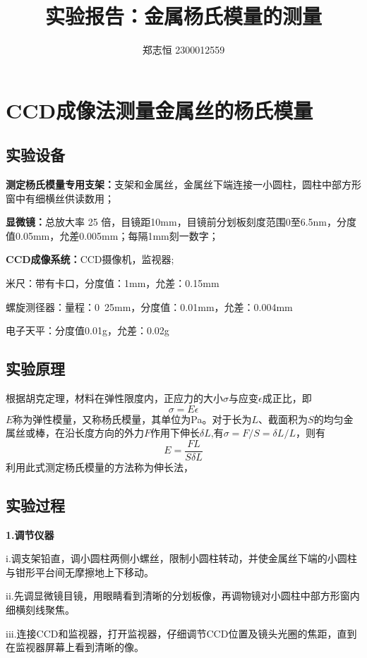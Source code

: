 \documentclass[a4paper, 10pt]{article}
\begin{document}
  \title{实验报告：金属杨氏模量的测量}
  \author{郑志恒 2300012559}
  \maketitle
  \section{CCD成像法测量金属丝的杨氏模量}
  \subsection{实验设备}
  \noindent \textbf{测定杨氏模量专用支架：}支架和金属丝，金属丝下端连接一小圆柱，圆柱中部方形窗中有细横丝供读数用；

  \vspace{10pt}
  \noindent \textbf{显微镜：}总放大率 25 倍，目镜距10mm，目镜前分划板刻度范围0至6.5nm，分度值0.05mm，允差0.005mm；每隔1mm刻一数字；
  
  \vspace{10pt}
  \noindent \textbf{CCD成像系统：}CCD摄像机，监视器;
  
  \vspace{10pt}
\noindent 米尺：带有卡口，分度值：1mm，允差：0.15mm

\noindent 螺旋测径器：量程：0~25mm，分度值：0.01mm，允差：0.004mm

\noindent 电子天平：分度值0.01g，允差：0.02g

\subsection{实验原理}
\noindent 根据胡克定理，材料在弹性限度内，正应力的大小$\sigma$与应变$\epsilon$成正比，即
$$\sigma=E\epsilon$$
$E$称为弹性模量，又称杨氏模量，其单位为Pa。对于长为$L$、截面积为$S$的均匀金属丝或棒，在沿长度方向的外力$F$作用下伸长$\delta L$,有$\sigma=F/S=\delta L/L$，则有
$$E=\frac{FL}{S\delta L}$$
利用此式测定杨氏模量的方法称为伸长法，
\subsection{实验过程}
\noindent \textbf{1.调节仪器}

\noindent i.调支架铅直，调小圆柱两侧小螺丝，限制小圆柱转动，并使金属丝下端的小圆柱与钳形平台间无摩擦地上下移动。

\noindent ii.先调显微镜目镜，用眼睛看到清晰的分划板像，再调物镜对小圆柱中部方形窗内细横刻线聚焦。

\noindent iii.连接CCD和监视器，打开监视器，仔细调节CCD位置及镜头光圈的焦距，直到在监视器屏幕上看到清晰的像。
\end{document}
